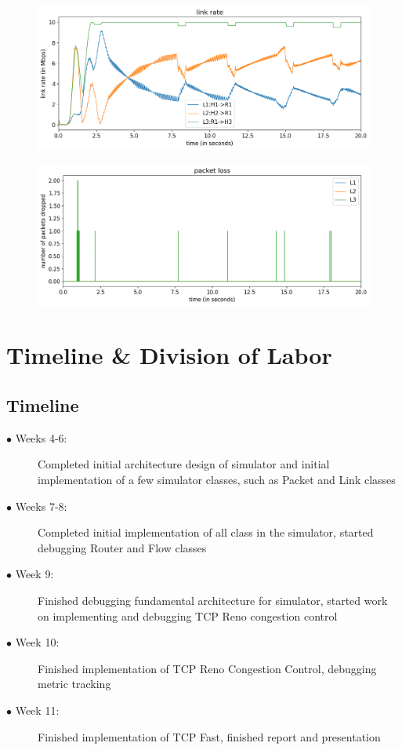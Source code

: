 \documentclass{article}
\begin{document}
\begin{figure}[H]
\centering
\includegraphics[width = \textwidth]{test_case_custom link rate.png}
\end{figure}

\begin{figure}[H]
\centering
\includegraphics[width = \textwidth]{test_case_custom packet loss.png}
\end{figure}


\section{Timeline \& Division of Labor}

\subsection{Timeline}

\begin{description}
  \item[$\bullet$ Weeks 4-6:] Completed initial architecture design of simulator and initial implementation of a few simulator classes, such as Packet and Link classes
  \item[$\bullet$ Weeks 7-8:] Completed initial implementation of all class in the simulator, started debugging Router and Flow classes 
  \item[$\bullet$ Week 9:] Finished debugging fundamental architecture for simulator, started work on implementing and debugging TCP Reno congestion control
  \item[$\bullet$ Week 10:] Finished implementation of TCP Reno Congestion Control, debugging metric tracking
  \item[$\bullet$ Week 11:] Finished implementation of TCP Fast, finished report and presentation
\end{description}
\end{document}
